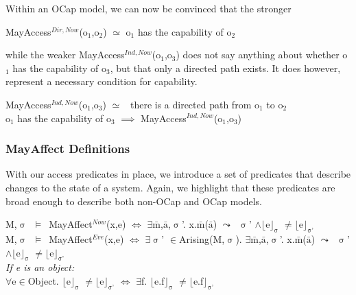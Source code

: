 \documentclass[a4paper,11pt, twoside,twocolumn]{article}
\newenvironment{logic}[1][]
{\begin{flushleft} \small }
{\end{flushleft}}
\newcommand{\loin}{$\in$}
\newcommand{\loforall}{$\forall$}
\newcommand{\loexists}{$\exists$}
\newcommand{\loand}{$\land$}
\newcommand{\loneq} {$\neq$}
\newcommand{\losimeq} {$\simeq$}
\newcommand{\loimplies}{$\implies$}
\newcommand{\losigma}{$\upsigma$}
\newcommand{\loturns} {$\vDash$}
\newcommand{\loiff} {$\iff$}
\newcommand{\loleadsto} {$\leadsto$}
\newcommand{\loexec}[2] {$\lfloor$#1$\rfloor _{\text{#2}}$}
\newcommand{\loconj}[1] {$\bar{\text{#1}}$}
\newcommand{\ablock} {\null\qquad}
\begin{document}
Within an OCap model, we can now be convinced that the stronger
\begin{logic}
MayAccess$^{Dir,Now}$(o$_1$,o$_2$) \losimeq \linebreak
\ablock o$_1$ has the capability of o$_2$\end{logic}
while the weaker MayAccess$^{Ind,Now}$(o$_1$,o$_3$) does not say anything about whether o$_1$ has the capability of o$_3$, but that only a directed path exists. It does however, represent a necessary condition for capability.
\begin{logic}
MayAccess$^{Ind,Now}$(o$_1$,o$_3$) \losimeq\ \linebreak
\ablock there is a directed path from o$_1$ to o$_2$\linebreak
\\
o$_1$ has the capability of o$_3$ \loimplies \linebreak
\ablock MayAccess$^{Ind,Now}$(o$_1$,o$_3$)\end{logic}
\subsubsection{MayAffect Definitions}
With our access predicates in place, we introduce a set of predicates that describe changes to the state of a system. Again, we highlight that these predicates are broad enough to describe both non-OCap and OCap models. 
\begin{logic}
M,\losigma\ \loturns\ MayAffect$^{Now}$(x,e) \loiff \linebreak
\ablock \loexists \loconj{m},\loconj{a},\losigma'. x.\loconj{m}(\loconj{a}) \loleadsto\ \losigma' \loand \loexec{e}{\losigma} \loneq \loexec{e}{\losigma'}
\linebreak \\
M,\losigma\ \loturns\ MayAffect$^{Eve}$(x,e) \loiff \linebreak
\ablock \loexists \losigma' \loin Arising(M,\losigma).\linebreak
\ablock \loexists \loconj{m},\loconj{a},\losigma'. x.\loconj{m}(\loconj{a}) \loleadsto\ \losigma' \loand \loexec{e}{\losigma} \loneq \loexec{e}{\losigma'}
\linebreak \\
\textit{If e is an object:} \\
\loforall e\loin Object. \loexec{e}{\losigma} \loneq \loexec{e}{\losigma'} \loiff \linebreak
\ablock \loexists f. \loexec{e.f}{\losigma} \loneq \loexec{e.f}{\losigma'}
\end{logic}
\end{document}
